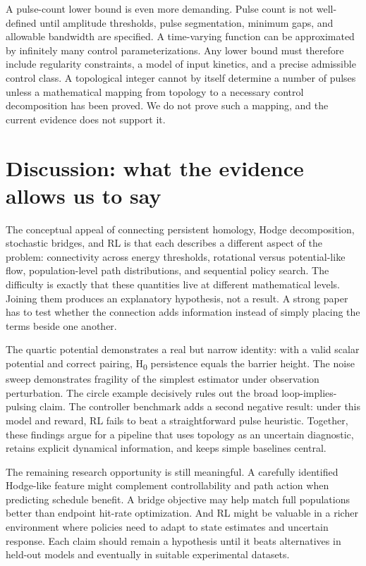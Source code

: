 \documentclass[11pt]{article}
\newcommand{\1}{\mathbf{1}}
\begin{document}
A pulse-count lower bound is even more demanding. Pulse count is not well-defined until amplitude thresholds, pulse segmentation, minimum gaps, and allowable bandwidth are specified. A time-varying function can be approximated by infinitely many control parameterizations. Any lower bound must therefore include regularity constraints, a model of input kinetics, and a precise admissible control class. A topological integer cannot by itself determine a number of pulses unless a mathematical mapping from topology to a necessary control decomposition has been proved. We do not prove such a mapping, and the current evidence does not support it.

\section{Discussion: what the evidence allows us to say}
The conceptual appeal of connecting persistent homology, Hodge decomposition, stochastic bridges, and RL is that each describes a different aspect of the problem: connectivity across energy thresholds, rotational versus potential-like flow, population-level path distributions, and sequential policy search. The difficulty is exactly that these quantities live at different mathematical levels. Joining them produces an explanatory hypothesis, not a result. A strong paper has to test whether the connection adds information instead of simply placing the terms beside one another.

The quartic potential demonstrates a real but narrow identity: with a valid scalar potential and correct pairing, H\textsubscript{0} persistence equals the barrier height. The noise sweep demonstrates fragility of the simplest estimator under observation perturbation. The circle example decisively rules out the broad loop-implies-pulsing claim. The controller benchmark adds a second negative result: under this model and reward, RL fails to beat a straightforward pulse heuristic. Together, these findings argue for a pipeline that uses topology as an uncertain diagnostic, retains explicit dynamical information, and keeps simple baselines central.

The remaining research opportunity is still meaningful. A carefully identified Hodge-like feature might complement controllability and path action when predicting schedule benefit. A bridge objective may help match full populations better than endpoint hit-rate optimization. And RL might be valuable in a richer environment where policies need to adapt to state estimates and uncertain response. Each claim should remain a hypothesis until it beats alternatives in held-out models and eventually in suitable experimental datasets.
\end{document}

